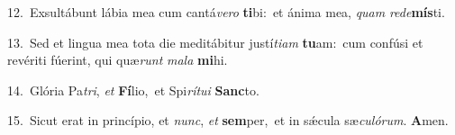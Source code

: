 {\numbfont\textcolor{\numbcolor}{12.}}~Exsultábunt lábia mea cum cantá\-\textit{ve}\-\textit{ro} \textbf{ti}\-bi:~\star et ánima mea, \textit{quam} \textit{red}\-\textit{e}\textbf{mís}ti.\par
{\numbfont\textcolor{\numbcolor}{13.}}~Sed et lingua mea tota die meditábitur justí\-\textit{ti}\-\textit{am} \textbf{tu}\-am:~\star cum confúsi et revériti fúerint, qui quæ\textit{runt} \textit{ma}\-\textit{la} \textbf{mi}\-hi.\par
{\numbfont\textcolor{\numbcolor}{14.}}~Glória Pa\-\textit{tri}\-, \textit{et} \textbf{Fí}\-lio,~\star et Spi\-\textit{rí}\-\textit{tu}\textit{i} \textbf{Sanc}\-to.\par
{\numbfont\textcolor{\numbcolor}{15.}}~Sicut erat in princípio, et \textit{nunc}\-, \textit{et} \textbf{sem}\-per,~\star et in sǽcula sæ\-\textit{cu}\-\textit{ló}\textit{rum}. \textbf{A}\-men.\par
